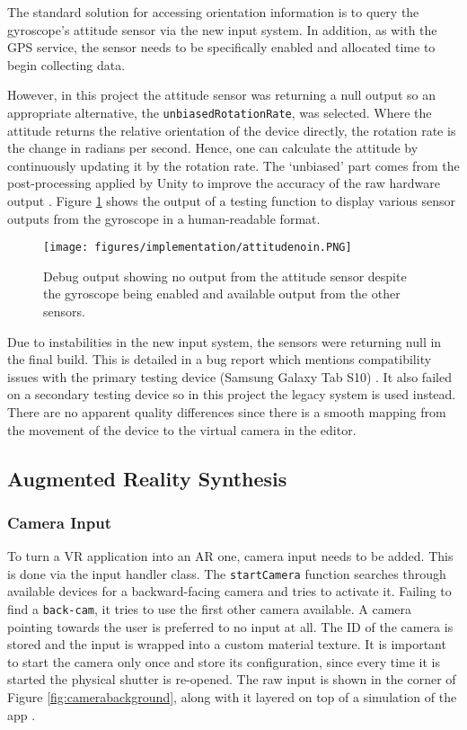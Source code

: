 \documentclass[12pt, a4paper]{article}
\begin{document}
The standard solution for accessing orientation information is to query the gyroscope's attitude sensor via the new input system. In addition, as with the GPS service, the sensor needs to be specifically enabled and allocated time to begin collecting data.  

However, in this project the attitude sensor was returning a null output so an appropriate alternative, the \verb|unbiasedRotationRate|, was selected. Where the attitude returns the relative orientation of the device directly, the rotation rate is the change in radians per second. Hence, one can calculate the attitude by continuously updating it by the rotation rate. The `unbiased' part comes from the post-processing applied by Unity to improve the accuracy of the raw hardware output \cite{movement:rotationrate}. Figure \ref{fig:attitudezeros} shows the output of a testing function to display various sensor outputs from the gyroscope in a human-readable format.

\begin{figure}[h]
    \centering
    \texttt{[image: figures/implementation/attitudenoin.PNG]}
        \caption{Debug output showing no output from the attitude sensor despite the gyroscope being enabled and available output from the other sensors.}
        \label{fig:attitudezeros}
\end{figure}

Due to instabilities in the new input system, the sensors were returning null in the final build. This is detailed in a bug report which mentions compatibility issues with the primary testing device (Samsung Galaxy Tab S10) \cite{movement:gyroissue}. It also failed on a secondary testing device so in this project the legacy system is used instead. There are no apparent quality differences since there is a smooth mapping from the movement of the device to the virtual camera in the editor. 

\subsection{Augmented Reality Synthesis}
\label{augmentedrealitysynthesis}

\subsubsection{Camera Input}
To turn a VR application into an AR one, camera input needs to be added. This is done via the input handler class. The \verb|startCamera| function searches through available devices for a backward-facing camera and tries to activate it. Failing to find a \verb|back-cam|, it tries to use the first other camera available. A camera pointing towards the user is preferred to no input at all. The ID of the camera is stored and the input is wrapped into a custom material texture. It is important to start the camera only once and store its configuration, since every time it is started the physical shutter is re-opened. The raw input is shown in the corner of Figure \ref{fig:camerabackground}, along with it layered on top of a simulation of the app \cite{arsynthesis:cameratutorial}. 
\end{document}
